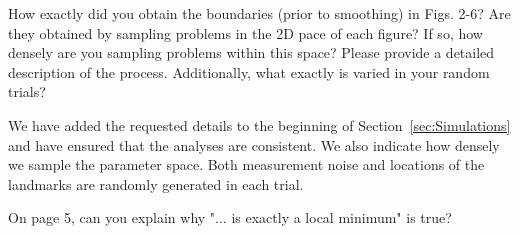 How exactly did you obtain the boundaries (prior to smoothing) in Figs. 2-6? Are they obtained by sampling problems in the 2D pace of each figure? If so, how densely are you sampling problems within this space? Please provide a detailed description of the process. Additionally, what exactly is varied in your random trials? 
\begin{response}

We have added the requested details to the beginning of Section~\ref{sec:Simulations} and have ensured that the analyses are consistent. We also indicate how densely we sample the parameter space. Both measurement noise and locations of the landmarks are randomly generated in each trial.

\end{response}
On page 5, can you explain why "... is exactly a local minimum" is true? 
